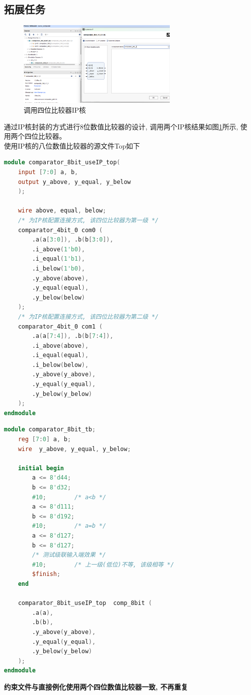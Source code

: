 \documentclass{article}
\begin{document}
\subsection*{拓展任务}
\begin{figure}[H]
    \centering
    \includegraphics[width=0.7\textwidth]{image/2024-06-15-22-16-36.png}
    \caption{调用四位比较器IP核}
    \label{image_useIP_1}
\end{figure}
通过IP核封装的方式进行8位数值比较器的设计, 调用两个IP核结果如图\ref{image_useIP_1}所示, 使用两个四位比较器。\\
使用IP核的八位数值比较器的源文件Top如下
\begin{lstlisting}[language=Verilog, caption={使用IP核的八位数值比较器的源文件}]
module comparator_8bit_useIP_top(
    input [7:0] a, b,
    output y_above, y_equal, y_below
    );

    wire above, equal, below;
    /* 为IP核配置连接方式, 该四位比较器为第一级 */
    comparator_4bit_0 com0 (
        .a(a[3:0]), .b(b[3:0]),
        .i_above(1'b0),
        .i_equal(1'b1),
        .i_below(1'b0),
        .y_above(above),
        .y_equal(equal),
        .y_below(below)
    );
    /* 为IP核配置连接方式, 该四位比较器为第二级 */
    comparator_4bit_0 com1 (
        .a(a[7:4]), .b(b[7:4]),
        .i_above(above),
        .i_equal(equal),
        .i_below(below),
        .y_above(y_above),
        .y_equal(y_equal),
        .y_below(y_below)
    );
endmodule
\end{lstlisting}
\begin{lstlisting}[language=Verilog, caption={使用IP核的八位数值比较器的仿真文件}]
module comparator_8bit_tb;
    reg [7:0] a, b;
    wire  y_above, y_equal, y_below;

    initial begin
        a <= 8'd44;
        b <= 8'd32;
        #10;        /* a<b */
        a <= 8'd111;
        b <= 8'd192;
        #10;        /* a=b */
        a <= 8'd127;
        b <= 8'd127;
        /* 测试级联输入端效果 */
        #10;        /* 上一级(低位)不等, 该级相等 */
        $finish;
    end

    comparator_8bit_useIP_top  comp_8bit (
        .a(a),
        .b(b),
        .y_above(y_above),
        .y_equal(y_equal),
        .y_below(y_below)
    );
endmodule
\end{lstlisting}
\textbf{约束文件与直接例化使用两个四位数值比较器一致, 不再重复}
\end{document}
